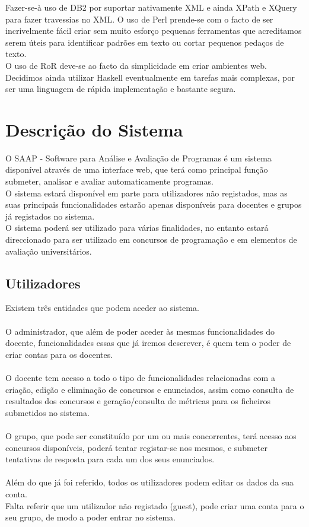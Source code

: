 Fazer-se-à uso de DB2 por suportar nativamente XML e ainda XPath e XQuery para fazer travessias no XML. O uso de Perl prende-se com o facto de ser incrivelmente fácil criar
sem muito esforço pequenas ferramentas que acreditamos serem úteis para identificar padrões em texto ou cortar pequenos pedaços de texto.\\
O uso de RoR deve-se ao facto da simplicidade em criar ambientes web. Decidimos ainda utilizar Haskell eventualmente em tarefas mais complexas, por ser uma linguagem de rápida
implementação e bastante segura.

\section{Descrição do Sistema}
O SAAP - Software para Análise e Avaliação de Programas é um sistema disponível através de uma interface web, que terá como principal função 
submeter, analisar e avaliar automaticamente programas.\\
O sistema estará disponível em parte para utilizadores não registados, mas as suas principais funcionalidades estarão apenas disponíveis para docentes 
e grupos já registados no sistema.\\
O sistema poderá ser utilizado para várias finalidades, no entanto estará direccionado para ser utilizado em concursos de programação e em elementos 
de avaliação universitários.

\subsection{Utilizadores}
Existem três entidades que podem aceder ao sistema.\\ \\
O administrador, que além de poder aceder às mesmas funcionalidades do docente, funcionalidades essas que já iremos descrever, é quem tem o poder de
criar contas para os docentes.\\
\\
O docente tem acesso a todo o tipo de funcionalidades relacionadas com a criação, edição e eliminação de concursos e enunciados, assim como consulta
de resultados dos concursos e geração/consulta de métricas para os ficheiros submetidos no sistema.\\
\\
O grupo, que pode ser constituído por um ou mais concorrentes, terá acesso aos concursos disponíveis, poderá tentar registar-se nos mesmos, e submeter
tentativas de resposta para cada um dos seus enunciados.\\
\\
Além do que já foi referido, todos os utilizadores podem editar os dados da sua conta.\\ 
Falta referir que um utilizador não registado (guest), pode criar uma conta para o seu grupo, de modo a poder entrar no sistema.

